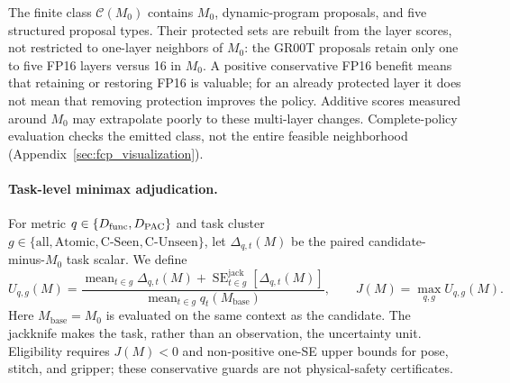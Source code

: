 The finite class $\mathcal C(M_0)$ contains $M_0$, dynamic-program proposals, and five structured proposal types. Their protected sets are rebuilt from the layer scores, not restricted to one-layer neighbors of $M_0$: the GR00T proposals retain only one to five FP16 layers versus 16 in $M_0$. A positive conservative FP16 benefit means that retaining or restoring FP16 is valuable; for an already protected layer it does not mean that removing protection improves the policy. Additive scores measured around $M_0$ may extrapolate poorly to these multi-layer changes. Complete-policy evaluation checks the emitted class, not the entire feasible neighborhood (Appendix~\ref{sec:fcp_visualization}).

\paragraph{Task-level minimax adjudication.}
For metric $q\in\{D_{\mathrm{func}},D_{\mathrm{PAC}}\}$ and task cluster $g\in\{\mathrm{all},\mathrm{Atomic},\mathrm{C\text{-}Seen},\mathrm{C\text{-}Unseen}\}$, let $\Delta_{q,t}(M)$ be the paired candidate-minus-$M_0$ task scalar. We define
\begin{equation}
 U_{q,g}(M)=
 \frac{\operatorname{mean}_{t\in g}\Delta_{q,t}(M)+
 \operatorname{SE}^{\mathrm{jack}}_{t\in g}[\Delta_{q,t}(M)]}
 {\operatorname{mean}_{t\in g}q_t(M_{\mathrm{base}})},
 \qquad
 J(M)=\max_{q,g}U_{q,g}(M).
 \label{eq:minimax}
\end{equation}
Here $M_{\mathrm{base}}=M_0$ is evaluated on the same context as the candidate. The jackknife makes the task, rather than an observation, the uncertainty unit. Eligibility requires $J(M)<0$ and non-positive one-SE upper bounds for pose, stitch, and gripper; these conservative guards are not physical-safety certificates.

